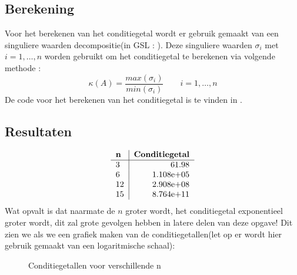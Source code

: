 \documentclass[10pt,a4paper,twocolumn]{article}
\begin{document}
\subsection{Berekening}
Voor het berekenen van het conditiegetal wordt er gebruik gemaakt van een singuliere waarden decompositie(in GSL : \texttt{}). Deze singuliere waarden $\sigma_{i}$ met $i = 1,\hdots,n$ worden gebruikt om het conditiegetal te berekenen via volgende methode : 
$$\kappa(A) = \frac{max(\sigma_{i})}{min(\sigma_{i})} \qquad i = 1,\hdots,n$$
De code voor het berekenen van het conditiegetal is te vinden in \texttt{}.
\subsection{Resultaten}
$$
 \begin{tabular}{ l | r }
   \textbf{n} & \textbf{Conditiegetal} \\ \hline
   3 & 61.98 \\
   6 & 1.108e+05 \\
   12 & 2.908e+08 \\
   15 & 8.764e+11 \\
\end{tabular}
$$
Wat opvalt is dat naarmate de $n$ groter wordt, het conditiegetal exponentieel groter wordt, dit zal grote gevolgen hebben in latere delen van deze opgave!
\newline
Dit zien we als we een grafiek maken van de conditiegetallen(let op er wordt hier gebruik gemaakt van een logaritmische schaal):
\begin{figure}[H]
\label{fig:conditiegetalgrafiek}
\caption{Conditiegetallen voor verschillende n}
\end{figure}
\end{document}
